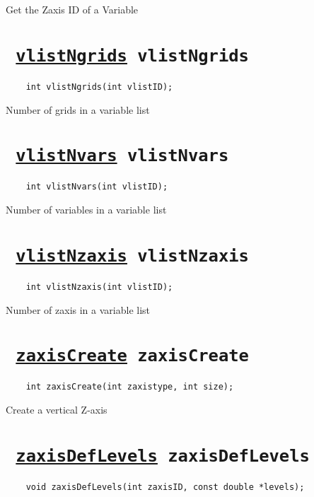 Get the Zaxis ID of a Variable
\ifpdfoutput{}{(\ref{vlistInqVarZaxis})}


\section*{\texttt{ 
\ifpdf
\hyperref[vlistNgrids]{vlistNgrids}
\else
vlistNgrids
\fi
}}
\begin{verbatim}
    int vlistNgrids(int vlistID);
\end{verbatim}

Number of grids in a variable list
\ifpdfoutput{}{(\ref{vlistNgrids})}


\section*{\texttt{ 
\ifpdf
\hyperref[vlistNvars]{vlistNvars}
\else
vlistNvars
\fi
}}
\begin{verbatim}
    int vlistNvars(int vlistID);
\end{verbatim}

Number of variables in a variable list
\ifpdfoutput{}{(\ref{vlistNvars})}


\section*{\texttt{ 
\ifpdf
\hyperref[vlistNzaxis]{vlistNzaxis}
\else
vlistNzaxis
\fi
}}
\begin{verbatim}
    int vlistNzaxis(int vlistID);
\end{verbatim}

Number of zaxis in a variable list
\ifpdfoutput{}{(\ref{vlistNzaxis})}


\section*{\texttt{ 
\ifpdf
\hyperref[zaxisCreate]{zaxisCreate}
\else
zaxisCreate
\fi
}}
\begin{verbatim}
    int zaxisCreate(int zaxistype, int size);
\end{verbatim}

Create a vertical Z-axis
\ifpdfoutput{}{(\ref{zaxisCreate})}


\section*{\texttt{ 
\ifpdf
\hyperref[zaxisDefLevels]{zaxisDefLevels}
\else
zaxisDefLevels
\fi
}}
\begin{verbatim}
    void zaxisDefLevels(int zaxisID, const double *levels);
\end{verbatim}

